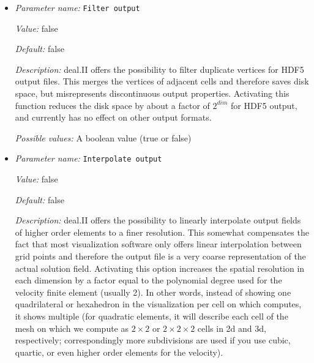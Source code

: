 \begin{itemize}
\item {\it Parameter name:} {\tt Filter output}
\label{parameters:Postprocess/Visualization/Filter output}


{\it Value:} false


{\it Default:} false


{\it Description:} deal.II offers the possibility to filter duplicate vertices for HDF5 output files. This merges the vertices of adjacent cells and therefore saves disk space, but misrepresents discontinuous output properties. Activating this function reduces the disk space by about a factor of $2^{dim}$ for HDF5 output, and currently has no effect on other output formats. 


{\it Possible values:} A boolean value (true or false)
\item {\it Parameter name:} {\tt Interpolate output}
\label{parameters:Postprocess/Visualization/Interpolate output}


{\it Value:} false


{\it Default:} false


{\it Description:} deal.II offers the possibility to linearly interpolate output fields of higher order elements to a finer resolution. This somewhat compensates the fact that most visualization software only offers linear interpolation between grid points and therefore the output file is a very coarse representation of the actual solution field. Activating this option increases the spatial resolution in each dimension by a factor equal to the polynomial degree used for the velocity finite element (usually 2). In other words, instead of showing one quadrilateral or hexahedron in the visualization per cell on which \aspect{} computes, it shows multiple (for quadratic elements, it will describe each cell of the mesh on which we compute as $2\times 2$ or $2\times 2\times 2$ cells in 2d and 3d, respectively; correspondingly more subdivisions are used if you use cubic, quartic, or even higher order elements for the velocity).


\end{itemize}
